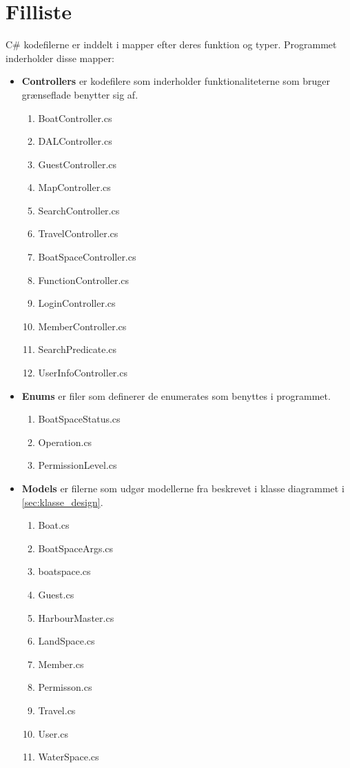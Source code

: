 \chapter{Filliste}
\label{cha:filliste}

C\# kodefilerne er inddelt i mapper efter deres funktion og typer.
Programmet inderholder disse mapper:

\begin{itemize}
	\item \textbf{Controllers} er kodefilere som inderholder funktionaliteterne som bruger grænseflade benytter sig af. 
		\begin{enumerate}
			\item BoatController.cs
			\item DALController.cs
			\item GuestController.cs
			\item MapController.cs
			\item SearchController.cs
			\item TravelController.cs
			\item BoatSpaceController.cs
			\item FunctionController.cs
			\item LoginController.cs
			\item MemberController.cs
			\item SearchPredicate.cs
			\item UserInfoController.cs
		\end{enumerate}	
\end{itemize}


\begin{itemize}
	\item \textbf{Enums} er filer som definerer de enumerates som benyttes i programmet.
		\begin{enumerate}
			\item BoatSpaceStatus.cs
			\item Operation.cs
			\item PermissionLevel.cs
		\end{enumerate}
\end{itemize}

\begin{itemize}
	\item \textbf{Models} er filerne som udgør modellerne fra beskrevet i klasse diagrammet i \cref{sec:klasse_design}.
		\begin{enumerate}
			\item Boat.cs
			\item BoatSpaceArgs.cs
			\item boatspace.cs
			\item Guest.cs
			\item HarbourMaster.cs
			\item LandSpace.cs
			\item Member.cs
			\item Permisson.cs
			\item Travel.cs
			\item User.cs
			\item WaterSpace.cs

		\end{enumerate}
\end{itemize}


